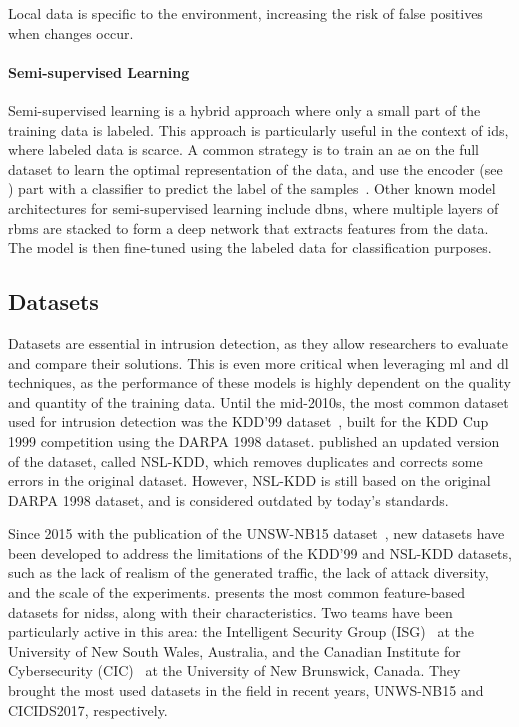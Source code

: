\begin{challenge}
  Local data is specific to the environment, increasing the risk of false positives when changes occur.
  \label{chall:specificity}
\end{challenge}


\paragraph{Semi-supervised Learning}

Semi-supervised learning is a hybrid approach where only a small part of the training data is labeled.
This approach is particularly useful in the context of \gls{ids}, where labeled data is scarce.
A common strategy is to train an \gls{ae} on the full dataset to learn the optimal representation of the data, and use the encoder (see ) part with a classifier to predict the label of the samples~\cite{aouedi_SemisupervisedStackedAutoencoder_2020}.
Other known model architectures for semi-supervised learning include \glspl{dbn}, where multiple layers of \glspl{rbm} are stacked to form a deep network that extracts features from the data.
The model is then fine-tuned using the labeled data for classification purposes.


\subsection{Datasets\label{sec:bg.ids.datasets}}

Datasets are essential in intrusion detection, as they allow researchers to evaluate and compare their solutions.
This is even more critical when leveraging \gls{ml} and \gls{dl} techniques, as the performance of these models is highly dependent on the quality and quantity of the training data.
Until the mid-2010s, the most common dataset used for intrusion detection was the {KDD'99} dataset~\cite{kddcup99}, built for the KDD Cup 1999 competition using the DARPA 1998 dataset.
\Textcite{tavallaee_detailedanalysisKDD_2009} published an updated version of the dataset, called NSL-KDD, which removes duplicates and corrects some errors in the original dataset.
However, NSL-KDD is still based on the original DARPA 1998 dataset, and is considered outdated by today's standards.

Since 2015 with the publication of the UNSW-NB15 dataset~\cite{moustafa_UNSWNB15comprehensivedata_2015}, new datasets have been developed to address the limitations of the KDD'99 and NSL-KDD datasets, such as the lack of realism\footnotemark{} of the generated traffic, the lack of attack diversity, and the scale of the experiments.
 presents the most common feature-based datasets for \glspl{nids}, along with their characteristics.
Two teams have been particularly active in this area: the Intelligent Security Group (ISG)~\cite{moustafa_UNSWNB15comprehensivedata_2015,koroniotis_developmentrealisticbotnet_2019,moustafa_newdistributedarchitecture_2021} at the University of New South Wales, Australia, and the Canadian Institute for Cybersecurity (CIC)~\cite{sharafaldin_GeneratingNewIntrusion_2018} at the University of New Brunswick, Canada.
They brought the most used datasets in the field in recent years, UNWS-NB15 and CICIDS2017, respectively.

